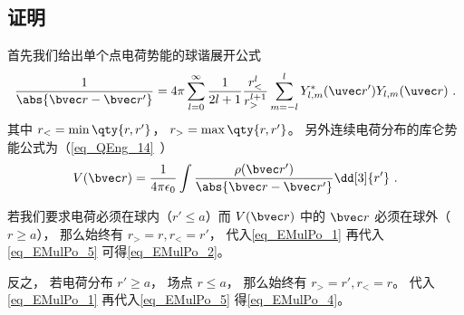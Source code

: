 \subsection{证明}
首先我们给出单个点电荷势能的球谐展开公式
\begin{equation}\label{eq_EMulPo_1}
\frac{1}{\abs{\bvec r - \bvec r'}} = 4\pi \sum_{l=0}^{\infty} \frac{1}{2l+1} \frac{r_<^l}{r_>^{l+1}} \sum_{m = -l}^l Y_{l,m}^*(\uvec r') Y_{l,m}(\uvec r)~.
\end{equation}
其中 $r_< = \min\qty{r, r'}$， $r_> = \max\qty{r, r'}$。 另外连续电荷分布的库仑势能公式为（\autoref{eq_QEng_14}~）
\begin{equation}\label{eq_EMulPo_5}
V(\bvec r) = \frac{1}{4\pi\epsilon_0}\int \frac{\rho(\bvec r')}{\abs{\bvec r - \bvec r'}} \dd[3]{r'}~.
\end{equation}

若我们要求电荷必须在球内（$r' \leqslant a$）而 $V(\bvec r)$ 中的 $\bvec r$ 必须在球外（$r \geqslant a$）， 那么始终有 $r_> = r, r_< = r'$， 代入\autoref{eq_EMulPo_1} 再代入\autoref{eq_EMulPo_5} 可得\autoref{eq_EMulPo_2}。

反之， 若电荷分布 $r' \geqslant a$， 场点 $r \leqslant a$， 那么始终有 $r_> = r', r_< = r$。 代入\autoref{eq_EMulPo_1} 再代入\autoref{eq_EMulPo_5} 得\autoref{eq_EMulPo_4}。

